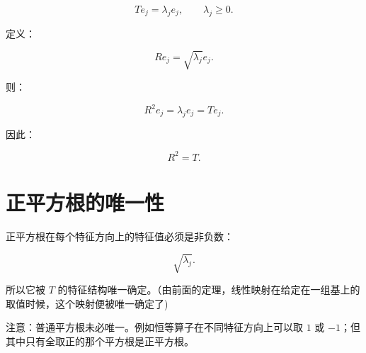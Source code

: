 \[
Te_j=\lambda_je_j,
\qquad
\lambda_j\ge0.
\]

定义：

\[
Re_j=\sqrt{\lambda_j}e_j.
\]

则：

\[
R^2e_j=\lambda_je_j=Te_j.
\]

因此：

\[
R^2=T.
\]

\section{正平方根的唯一性}

正平方根在每个特征方向上的特征值必须是非负数：

\[
\sqrt{\lambda_j}.
\]

所以它被 $T$ 的特征结构唯一确定。（由前面的定理，线性映射在给定在一组基上的取值时候，这个映射便被唯一确定了)

注意：普通平方根未必唯一。例如恒等算子在不同特征方向上可以取 $1$ 或 $-1$；但其中只有全取正的那个平方根是正平方根。

